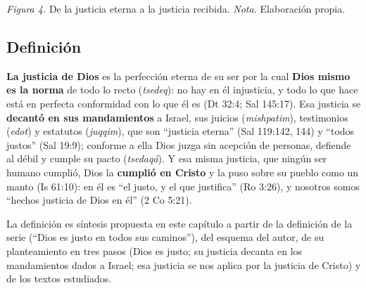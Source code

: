 \documentclass[11pt,letterpaper]{article}
\begin{document}
\begin{center}
\par
{\footnotesize\color{gris}\textit{Figura 4.} De la justicia eterna a la justicia recibida. \textit{Nota.} Elaboración propia.}
\end{center}

\subsection{Definición}
\begin{tcolorbox}[colback=papiro,colframe=azul,boxrule=1pt,arc=3pt]
\textbf{La justicia de Dios} es la perfección eterna de su ser por la cual \textbf{Dios mismo es la norma} de todo lo recto (\emph{tsedeq}): no hay en él injusticia, y todo lo que hace está en perfecta conformidad con lo que él es (Dt 32:4; Sal 145:17). Esa justicia se \textbf{decantó en sus mandamientos} a Israel, sus juicios (\emph{mishpatim}), testimonios (\emph{edot}) y estatutos (\emph{juqqim}), que son ``justicia eterna'' (Sal 119:142, 144) y ``todos justos'' (Sal 19:9); conforme a ella Dios juzga sin acepción de personas, defiende al débil y cumple su pacto (\emph{tsedaqá}). Y esa misma justicia, que ningún ser humano cumplió, Dios la \textbf{cumplió en Cristo} y la puso sobre su pueblo como un manto (Is 61:10): en él es ``el justo, y el que justifica'' (Ro 3:26), y nosotros somos ``hechos justicia de Dios en él'' (2 Co 5:21).
\end{tcolorbox}

\begin{nota}[Precisión]
La definición es síntesis propuesta en este capítulo a partir de la definición de la serie (``Dios es justo en todos sus caminos''), del esquema del autor, de su planteamiento en tres pasos (Dios es justo; su justicia decanta en los mandamientos dados a Israel; esa justicia se nos aplica por la justicia de Cristo) y de los textos estudiados.
\end{nota}
\end{document}
